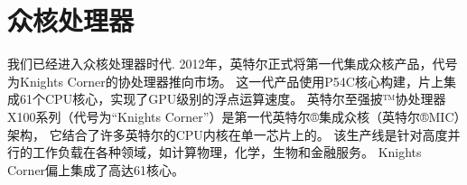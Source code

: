 
\chapter{众核处理器}
我们已经进入众核处理器时代\cite{MaWang:APCCAS'14}.
2012年，英特尔正式将第一代集成众核产品，代号为Knights Corner的协处理器推向市场。
这一代产品使用P54C核心构建，片上集成61个CPU核心，实现了GPU级别的浮点运算速度。
英特尔至强披™协处理器X100系列（代号为“Knights Corner”）是第一代英特尔®集成众核（英特尔®MIC）架构，
它结合了许多英特尔的CPU内核在单一芯片上的。
该生产线是针对高度并行的工作负载在各种领域，如计算物理，化学，生物和金融服务。
Knights Corner偏上集成了高达61核心。